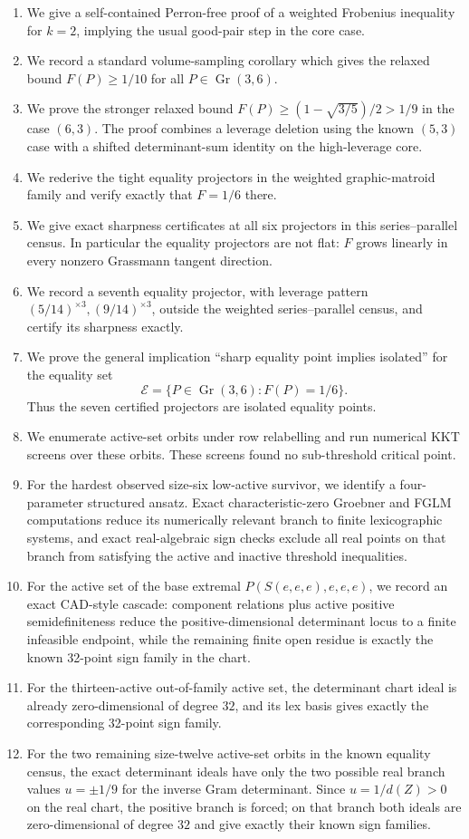 \documentclass[11pt]{article}
\numberwithin{equation}{section}
\theoremstyle{definition}
\newcommand{\Gr}{\operatorname{Gr}}
\newcommand{\cE}{\mathcal E}
\begin{document}
\begin{enumerate}[leftmargin=*]
\item We give a self-contained Perron-free proof of a weighted Frobenius
inequality for $k=2$, implying the usual good-pair step in the core case.
\item We record a standard volume-sampling corollary which gives the relaxed
bound $F(P)\ge 1/10$ for all $P\in\Gr(3,6)$.
\item We prove the stronger relaxed bound
$F(P)\ge(1-\sqrt{3/5})/2>1/9$ in the case $(6,3)$.
The proof combines a leverage deletion using the known $(5,3)$ case with a
shifted determinant-sum identity on the high-leverage core.
\item We rederive the tight equality projectors in the weighted graphic-matroid
family and verify exactly that $F=1/6$ there.
\item We give exact sharpness certificates at all six projectors in this
series--parallel census.  In particular the equality projectors are not flat:
$F$ grows linearly in every nonzero Grassmann tangent direction.
\item We record a seventh equality projector, with leverage pattern
$(5/14)^{\times3},(9/14)^{\times3}$, outside the weighted series--parallel census,
and certify its sharpness exactly.
\item We prove the general implication ``sharp equality point implies isolated''
for the equality set
\[
  \cE=\{P\in\Gr(3,6):F(P)=1/6\}.
\]
Thus the seven certified projectors are isolated equality points.
\item We enumerate active-set orbits under row relabelling and run numerical KKT
screens over these orbits.  These screens found no sub-threshold critical point.
\item For the hardest observed size-six low-active survivor, we identify a
four-parameter structured ansatz.  Exact characteristic-zero Groebner and FGLM
computations reduce its numerically relevant branch to finite lexicographic
systems, and exact real-algebraic sign checks exclude all real points on that
branch from satisfying the active and inactive threshold inequalities.
\item For the active set of the base extremal $P(S(e,e,e),e,e,e)$, we record an
exact CAD-style cascade: component relations plus active positive
semidefiniteness reduce the positive-dimensional determinant locus to a finite
infeasible endpoint, while the remaining finite open residue is exactly the
known 32-point sign family in the chart.
\item For the thirteen-active out-of-family active set, the determinant chart
ideal is already zero-dimensional of degree $32$, and its lex basis gives
exactly the corresponding 32-point sign family.
\item For the two remaining size-twelve active-set orbits in the known equality
census, the exact determinant ideals have only the two possible real branch
values $u=\pm1/9$ for the inverse Gram determinant.  Since $u=1/d(Z)>0$ on the
real chart, the positive branch is forced; on that branch both ideals are
zero-dimensional of degree $32$ and give exactly their known sign families.
\end{enumerate}
\end{document}
